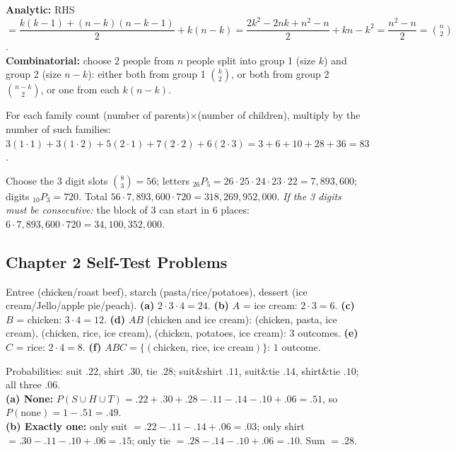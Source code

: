 \documentclass[11pt]{article}
\let\oldsubsection\subsection
\renewcommand{\subsection}{\Needspace{14\baselineskip}\oldsubsection}
\begin{document}
\begin{exbox}[1.17 Identity: $\binom n2=\binom k2+k(n-k)+\binom{n-k}2$, $1\le k\le n$]
\textbf{Analytic:} RHS $=\dfrac{k(k-1)+(n-k)(n-k-1)}2+k(n-k)=\dfrac{2k^2-2nk+n^2-n}2+kn-k^2=\dfrac{n^2-n}2=\binom n2$.\\
\textbf{Combinatorial:} choose 2 people from $n$ people split into group 1 (size $k$) and group 2 (size $n-k$): either both from group 1 $\binom k2$, or both from group 2 $\binom{n-k}2$, or one from each $k(n-k)$.
\end{exbox}

\begin{exbox}
For each family count (number of parents)$\times$(number of children), multiply by the number of such families: $3(1\cdot1)+3(1\cdot2)+5(2\cdot1)+7(2\cdot2)+6(2\cdot3)=3+6+10+28+36=\boxed{83}$.
\end{exbox}

\begin{exbox}
Choose the 3 digit slots $\binom83=56$; letters ${}_{26}P_5=26\cdot25\cdot24\cdot23\cdot22=7{,}893{,}600$; digits ${}_{10}P_3=720$. Total $56\cdot7{,}893{,}600\cdot720=\boxed{318{,}269{,}952{,}000}$. \emph{If the 3 digits must be consecutive:} the block of 3 can start in 6 places: $6\cdot7{,}893{,}600\cdot720=\boxed{34{,}100{,}352{,}000}$.
\end{exbox}

\subsection{Chapter 2 Self-Test Problems}

\begin{exbox}
Entree (chicken/roast beef), starch (pasta/rice/potatoes), dessert (ice cream/Jello/apple pie/peach). \textbf{(a)} $2\cdot3\cdot4=\boxed{24}$. \textbf{(b)} $A$ = ice cream: $2\cdot3=\boxed6$. \textbf{(c)} $B$ = chicken: $3\cdot4=\boxed{12}$. \textbf{(d)} $AB$ (chicken and ice cream): (chicken, pasta, ice cream), (chicken, rice, ice cream), (chicken, potatoes, ice cream): 3 outcomes. \textbf{(e)} $C$ = rice: $2\cdot4=\boxed8$. \textbf{(f)} $ABC=\{(\text{chicken, rice, ice cream})\}$: $\boxed1$ outcome.
\end{exbox}

\begin{exbox}
Probabilities: suit $.22$, shirt $.30$, tie $.28$; suit\&shirt $.11$, suit\&tie $.14$, shirt\&tie $.10$; all three $.06$.\\
\textbf{(a) None:} $P(S\cup H\cup T)=.22+.30+.28-.11-.14-.10+.06=.51$, so $P(\text{none})=1-.51=\boxed{.49}$.\\
\textbf{(b) Exactly one:} only suit $=.22-.11-.14+.06=.03$; only shirt $=.30-.11-.10+.06=.15$; only tie $=.28-.14-.10+.06=.10$. Sum $=\boxed{.28}$.
\end{exbox}
\end{document}
